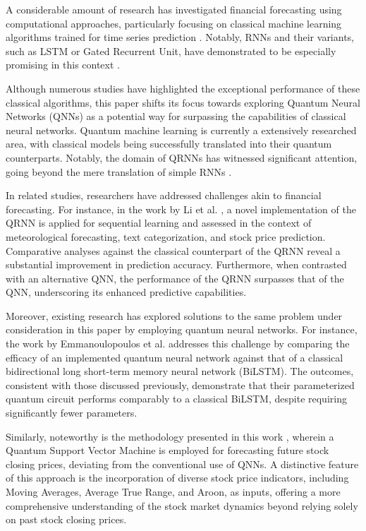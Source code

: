 A considerable amount of research has investigated financial forecasting using computational approaches, particularly focusing on classical machine learning algorithms trained for time series prediction \cite{DEGOOIJER2006443}. Notably, RNNs and their variants, such as LSTM or Gated Recurrent Unit, have demonstrated to be especially promising in this context \cite{SEZER2020106181} \cite{SAGHEER2019203} \cite{10.1145/3377713.3377722}.

Although numerous studies have highlighted the exceptional performance of these classical algorithms, this paper shifts its focus towards exploring Quantum Neural Networks (QNNs) as a potential way for surpassing the capabilities of classical neural networks. Quantum machine learning is currently a extensively researched area, with classical models being successfully translated into their quantum counterparts. Notably, the domain of QRNNs has witnessed significant attention, going beyond the mere translation of simple RNNs \cite{chen2020quantum} \cite{bausch2020recurrent}.

In related studies, researchers have addressed challenges akin to financial forecasting. For instance, in the work by Li et al. \cite{li2023quantum}, a novel implementation of the QRNN is applied for sequential learning and assessed in the context of meteorological forecasting, text categorization, and stock price prediction. Comparative analyses against the classical counterpart of the QRNN reveal a substantial improvement in prediction accuracy. Furthermore, when contrasted with an alternative QNN, the performance of the QRNN surpasses that of the QNN, underscoring its enhanced predictive capabilities.

Moreover, existing research has explored solutions to the same problem under consideration in this paper by employing quantum neural networks. For instance, the work by Emmanoulopoulos et al. \cite{emmanoulopoulos2022quantum} addresses this challenge by comparing the efficacy of an implemented quantum neural network against that of a classical bidirectional long short-term memory neural network (BiLSTM). The outcomes, consistent with those discussed previously, demonstrate that their parameterized quantum circuit performs comparably to a classical BiLSTM, despite requiring significantly fewer parameters.

Similarly, noteworthy is the methodology presented in this work \cite{s2023potential}, wherein a Quantum Support Vector Machine is employed for forecasting future stock closing prices, deviating from the conventional use of QNNs. A distinctive feature of this approach is the incorporation of diverse stock price indicators, including Moving Averages, Average True Range, and Aroon, as inputs, offering a more comprehensive understanding of the stock market dynamics beyond relying solely on past stock closing prices.

